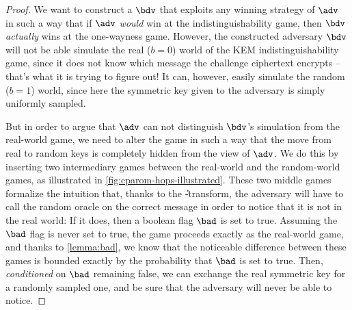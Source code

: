   \begin{proof} %
    We want to construct a $\bdv$ that exploits any winning
      strategy of $\adv$ in such a way that if $\adv$ \emph{would} win at the
      indistinguishability game, then $\bdv$ \emph{actually} wins
      at the one-wayness game.
      However, the constructed adversary $\bdv$ will not be able simulate the
      real ($b=0$) world of the KEM indistinguishability game, since it does
      not know which message the challenge ciphertext encrypts -- that's what
      it is trying to figure out! 
      It can, however, easily simulate the random ($b=1$) world, since here the
      symmetric key given to the adversary is simply uniformly sampled.

    But in order to argue that $\adv$ can not distinguish $\bdv$'s simulation
      from the real-world game, we need to alter the game in such a way that the
      move from real to random keys is completely hidden from the view of $\adv$.
      We do this by inserting two intermediary games between the real-world and the
      random-world games, as illustrated in \cref{fig:cparom-hops-illustrated}.
      These two middle games formalize the intuition that, thanks to the \U-transform,
      the adversary will have to call the random oracle on the correct message
      in order to notice that it is not in the real world: If it
      does, then a boolean flag $\bad$ is set to true. Assuming the $\bad$ flag is
      never set to true, the game proceeds exactly as the real-world game, and
      thanks to \cref{lemma:bad}, we know that the noticeable difference
      between these games is bounded exactly by the probability that $\bad$ is
      set to true. Then, \emph{conditioned} on $\bad$ remaining false,
      we can exchange the real symmetric key for a randomly
      sampled one, and be sure that the adversary will never be able to
      notice.


  

\end{proof}
